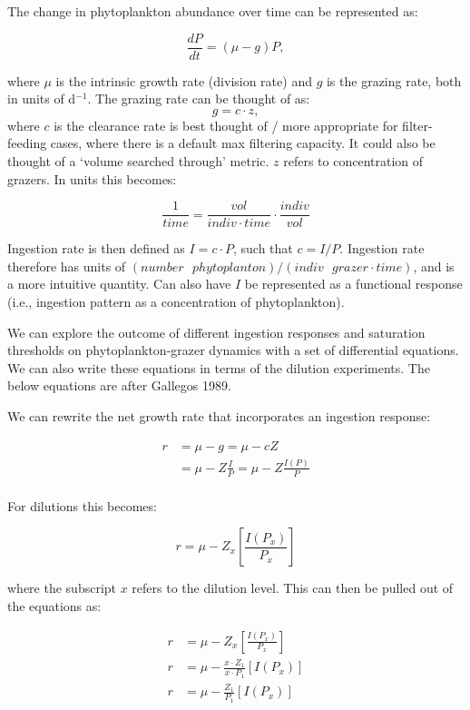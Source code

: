 \documentclass[11pt]{article}
\begin{document}
The change in phytoplankton abundance over time can be represented as:

\[
\frac{dP}{dt}=(\mu-g)P,
\]

where $\mu$ is the intrinsic growth rate (division rate) and $g$ is the grazing rate, both in units of d$^{-1}$. The grazing rate can be thought of as:
\[
g = c \cdot z,
\]
where $c$ is the clearance rate is best thought of / more appropriate for filter-feeding cases, where there is a default max filtering capacity. It could also be thought of a `volume searched through' metric. $z$ refers to concentration of grazers. In units this becomes:

\[
\frac{1}{time} = \frac{vol}{indiv \cdot time} \cdot \frac{indiv}{vol}
\]

Ingestion rate is then defined as $I = c \cdot P$, such that $c = I / P$. Ingestion rate therefore has units of $(number \text{ } phytoplanton) / (indiv \text{ } grazer \cdot time)$, and is a more intuitive quantity. Can also have $I$ be represented as a functional response (i.e., ingestion pattern as a concentration of phytoplankton).

 We can explore the outcome of different ingestion responses and saturation thresholds on phytoplankton-grazer dynamics with a set of differential equations. We can also write these equations in terms of the dilution experiments. The below equations are after Gallegos 1989.
 
 We can rewrite the net growth rate that incorporates an ingestion response:
 
 \begin{align}
 r &= \mu -g = \mu-cZ \\
 &= \mu - Z\frac{I}{P} = \mu - Z \frac{I(P)}{P}\\
  \end{align}
 
 For dilutions this becomes:
 
 \[
 r =\mu -Z_x\left[ \frac{I(P_x)}{P_x}\right]
 \]
 
 where the subscript $x$ refers to the dilution level. This can then be pulled out of the equations as:
 
 \begin{align}
 r &=\mu -Z_x\left[ \frac{I(P_x)}{P_x}\right] \\
 r &= \mu - \frac{x\cdot Z_1}{x \cdot P_1}  \left[ I(P_x)\right] \\
 r &= \mu - \frac{Z_1}{P_1}  \left[ I(P_x)\right]
 \end{align}
 
\end{document}
